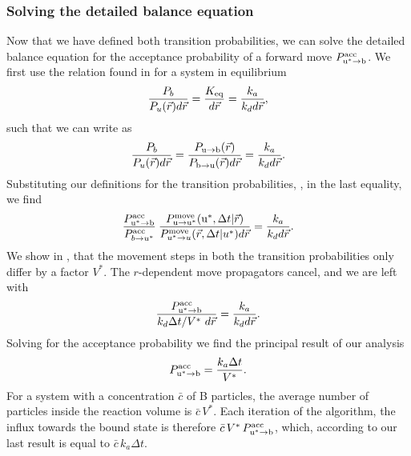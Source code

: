 \subsubsection{Solving the detailed balance equation}
Now that we have defined both transition probabilities, we can solve the detailed balance equation for the acceptance probability of a forward move $P^{\rm acc}_{{\rm u}^* \to {\rm b}}$. We first use the relation found in \cite{Morelli2008a} for a system in equilibrium
\begin{equation}
 \frac{P_b}{P_u(\vec{r})d\vec{r}} = \frac{K_{\rm eq}}{d\vec{r}} = \frac{k_a}{k_d d\vec{r}},
\end{equation}
such that we can write  as
\begin{equation}
 \frac{P_b}{P_u(\vec{r})d\vec{r}} = \frac{P_{ \rm{u} \to \rm{b} }(\vec{r})}{P_{ \rm{b} \to \rm{u} }(\vec{r})d\vec{r}} = \frac{k_a}{k_d d\vec{r}}.
\end{equation}
Substituting our definitions for the transition probabilities, , in the last equality, we find
\begin{equation}
 \frac{P^{\rm acc}_{{\rm u}^* \to {\rm b}}}{P^{\rm acc}_{b \to u^*}} \: \frac{P^{\rm move}_{{\rm u} \to {\rm u}^*}({\rm u}^*,\Delta t|\vec{r})}{P^{\rm move}_{u^* \to u}(\vec{r},\Delta t|u^*)d\vec{r}} = \frac{k_a}{k_d d\vec{r}}.
\end{equation}
We show in , that the movement steps in both the transition probabilities only differ by a factor $V^*$. The $r$-dependent move propagators cancel, and we are left with
\begin{equation}
 \frac{P^{\rm acc}_{{\rm u}^* \to {\rm b}}}{k_d \Delta t/V^* \,\, d\vec{r}} = \frac{k_a}{k_d d\vec{r}}.
\elabel{semi-pivotal}
\end{equation}
Solving for the acceptance probability we find the principal result of our analysis
\begin{equation}
 P^{\rm acc}_{{\rm u}^* \to {\rm b}} = \frac{k_a \Delta t}{V^*}.
\elabel{pivotal}
\end{equation}
For a system with a concentration $\bar{c}$ of B particles, the average number of particles inside the reaction volume is $\bar{c}\,V^*$. Each iteration of the algorithm, the influx towards the bound state is therefore $\bar{c}\,V^*\,P^{\rm acc}_{{\rm u}^* \to {\rm b}}$, which, according to our last result is equal to $\bar{c}\,k_a \Delta t$. 

